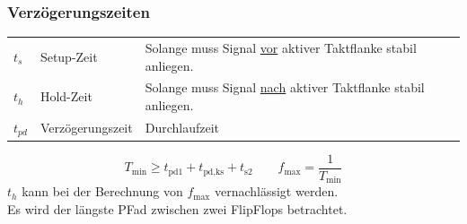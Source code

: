 \subsubsection{Verzögerungszeiten}
\begin{flushleft}
    \small
    \begin{tabular}{l l p{32mm}}
        $t_s$ & Setup-Zeit & Solange muss Signal \underline{vor} aktiver Taktflanke stabil anliegen.\\
        $t_h$ & Hold-Zeit & Solange muss Signal \underline{nach} aktiver Taktflanke stabil anliegen.\\
        $t_{pd}$ & Verzögerungszeit & Durchlaufzeit
    \end{tabular}
\end{flushleft}
\begin{equation*}
    T_{\text{min}} \geq t_{\text{pd}1} + t_{\text{pd,ks}} + t_{\text{s}2} \qquad f_{\text{max}} = \frac{1}{T_{\text{min}}}
\end{equation*}
$t_h$ kann bei der Berechnung von $f_{\text{max}}$ vernachlässigt werden.\\
Es wird der längste PFad zwischen zwei FlipFlops betrachtet.

